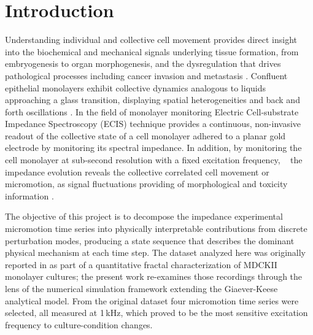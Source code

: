 \documentclass[english, 10pt, a4paper]{article}
\def\SI#1#2{#1\,#2}%
\begin{document}
\section{Introduction}
\label{sec:intro}

Understanding individual and collective cell movement provides direct insight into the biochemical and mechanical signals underlying tissue formation, from embryogenesis to organ morphogenesis, and the dysregulation that drives pathological processes including cancer invasion and metastasis \cite{trepat2009physical, matoz2017cell}. Confluent epithelial monolayers exhibit collective dynamics analogous to liquids approaching a glass transition, displaying spatial heterogeneities \cite{matoz2017cell,henkes2020dense} and back and forth oscillations \cite{petrolli2019confinement}. In the field of monolayer monitoring Electric Cell-substrate Impedance Spectroscopy (ECIS) technique provides a continuous, non-invasive readout of the collective state of a cell monolayer adhered to a planar gold electrode by monitoring its spectral impedance. In addition, by monitoring the cell monolayer at sub-second resolution with a fixed excitation frequency, ~\cite{giaever1991micromotion,giaever1993biosensor, keese1994biosensor,giana2018desarrollo} the impedance evolution reveals the collective correlated cell movement or micromotion, as signal fluctuations providing of morphological and toxicity information \cite{giaever1989fractal,lovelady2009detecting, tarantola2011toxicity,izzard1980formation, acerbo2024determining}. 

The objective of this project is to decompose the impedance experimental micromotion time series into physically interpretable contributions from discrete perturbation modes, producing a state sequence that describes the dominant physical mechanism at each time step. The dataset analyzed here was originally reported in \cite{acerbo2024determining} as part of a quantitative fractal characterization of MDCKII monolayer cultures; the present work re-examines those recordings through the lens of the numerical simulation framework extending the Giaever-Keese analytical model. From the original dataset four micromotion time series were selected, all measured at \SI{1}{kHz}, which proved to be the most sensitive excitation frequency to culture-condition changes. 
\end{document}

